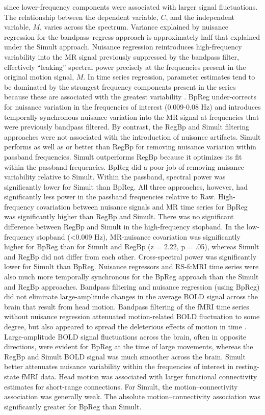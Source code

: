 \documentclass[twoside,twocolumn]{article}
\begin{document}
since lower-frequency components were associated with larger signal ﬂuctuations. The relationship between the dependent variable, $C$, and the independent variable, $M$, varies across the spectrum\cite{Engle1974}. Variance explained by nuisance regression for the bandpass–regress approach is approximately half that explained under the Simult approach\cite{Hallquist2013}.  Nuisance regression reintroduces high-frequency variability into the MR signal previously suppressed by the bandpass ﬁlter, effectively ``leaking'' spectral power precisely at the frequencies present in the original motion signal, $M$\cite{Hallquist2013}.  In time series regression, parameter estimates tend to be dominated by the strongest frequency components present in the series because these are associated with the greatest variability \cite{Engle1974}.  BpReg under-corrects for nuisance variation in the frequencies of interest (0.009-0.08 Hz) and introduces temporally synchronous nuisance variation into the MR signal at frequencies that were previously bandpass ﬁltered. By contrast, the RegBp and Simult ﬁltering approaches were not associated with the introduction of nuisance artifacts\cite{Hallquist2013}.  Simult performs as well as or better than RegBp for removing nuisance variation within passband frequencies.  Simult outperforms RegBp because it optimizes its ﬁt within the passband frequencies\cite{Hallquist2013}.  BpReg did a poor job of removing nuisance variability relative to Simult.  Within the passband, spectral power was signiﬁcantly lower for Simult than BpReg.  All three approaches, however, had signiﬁcantly less power in the passband frequencies relative to Raw.  High-frequency covariation between nuisance signals and MR time series for BpReg was signiﬁcantly higher than RegBp and Simult.  There was no signiﬁcant difference between RegBp and Simult in the high-frequency stopband.  In the low-frequency stopband (<0.009 Hz), MR-nuisance covariation was signiﬁcantly higher for BpReg than for Simult and RegBp (z = 2.22, p = .05), whereas Simult and RegBp did not differ from each other.  Cross-spectral power was signiﬁcantly lower for Simult than BpReg.  Nuisance regressors and RS-fcMRI time series were also much more temporally synchronous for the BpReg approach than the Simult and RegBp approaches.  Bandpass ﬁltering and nuisance regression (using BpReg) did not eliminate large-amplitude changes in the average BOLD signal across the brain that result from head motion\cite{Power2012}.  Bandpass ﬁltering of the fMRI time series without nuisance regression attenuated motion-related BOLD ﬂuctuation to some degree, but also appeared to spread the deleterious effects of motion in time \cite{Hallquist2013}.  Large-amplitude BOLD signal ﬂuctuations across the brain, often in opposite directions, were evident for BpReg at the time of large movements, whereas the RegBp and Simult BOLD signal was much smoother across the brain.  Simult better attenuates nuisance variability within the frequencies of interest in resting-state fMRI data.  Head motion was associated with larger functional connectivity estimates for short-range connections.  For Simult, the motion–connectivity association was generally weak.  The absolute motion–connectivity association was signiﬁcantly greater for BpReg than Simult.  
\end{document}
